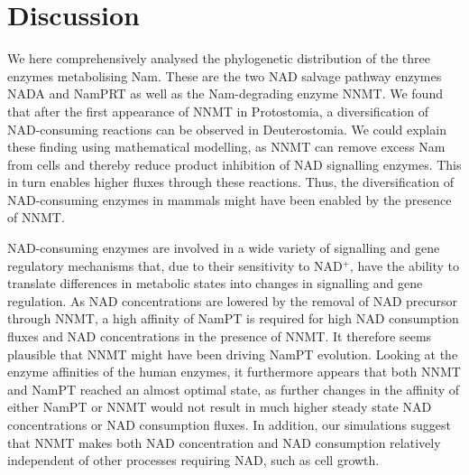 
\section{Discussion}

We here comprehensively analysed the phylogenetic distribution of the three enzymes metabolising  Nam. These are the two NAD salvage pathway enzymes NADA and NamPRT as well as the Nam-degrading enzyme NNMT. We found that after the first appearance of NNMT in Protostomia, a diversification of NAD-consuming reactions  can be observed in Deuterostomia. We could explain these finding using mathematical modelling, as NNMT can remove excess Nam from cells and thereby reduce product inhibition of NAD signalling enzymes. This in turn enables higher fluxes through these reactions. Thus, the diversification of NAD-consuming enzymes in mammals might have been enabled by the presence of NNMT.

NAD-consuming enzymes are involved in a wide variety of signalling and gene regulatory mechanisms that, due to their sensitivity to NAD$^{+}$, have the ability to translate differences in metabolic states into changes in signalling and gene regulation. As NAD concentrations are lowered by the removal of NAD precursor through  NNMT,  a high affinity of NamPT is required for high NAD consumption fluxes and NAD concentrations in the presence of NNMT. It therefore seems plausible that NNMT might have been driving NamPT evolution. Looking at the enzyme affinities of the human enzymes, it furthermore appears that both NNMT and NamPT reached an almost optimal state, as further changes in the affinity of either NamPT or NNMT would not result in much higher steady state NAD concentrations or NAD consumption fluxes. In addition, our simulations suggest that NNMT makes both NAD concentration and NAD consumption relatively independent of other processes requiring NAD, such as cell growth.

